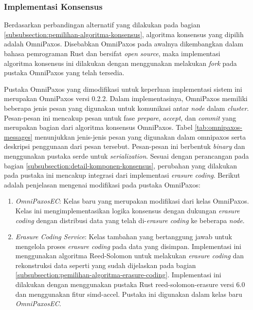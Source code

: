 \subsubsection{Implementasi Konsensus}
\label{subsubsection:implementasi-konsensus}

Berdasarkan perbandingan alternatif yang dilakukan pada bagian \ref{subsubsection:pemilihan-algoritma-konsensus}, algoritma konsensus yang dipilih adalah OmniPaxos. Disebabkan OmniPaxos pada awalnya dikembangkan dalam bahasa pemrograman Rust dan bersifat \textit{open source}, maka implementasi algoritma konsensus ini dilakukan dengan menggunakan melakukan \textit{fork} pada pustaka OmniPaxos yang telah tersedia.

Pustaka OmniPaxos yang dimodifikasi untuk keperluan implementasi sistem ini merupakan OmniPaxos versi 0.2.2. Dalam implementasinya, OmniPaxos memiliki beberapa jenis pesan yang digunakan untuk komunikasi antar \textit{node} dalam \textit{cluster}. Pesan-pesan ini mencakup pesan untuk fase \textit{prepare}, \textit{accept}, dan \textit{commit} yang merupakan bagian dari algoritma konsensus OmniPaxos. Tabel \ref{tab:omnipaxos-messages} menunjukkan jenis-jenis pesan yang digunakan dalam omnipaxos serta deskripsi penggunaan dari pesan tersebut. Pesan-pesan ini berbentuk \textit{binary} dan menggunakan pustaka serde untuk \textit{serialization}.
Sesuai dengan perancangan pada bagian \ref{subsubsection:detail-komponen-konsensus}, perubahan yang dilakukan pada pustaka ini mencakup integrasi dari implementasi \textit{erasure coding}. Berikut adalah penjelasan mengenai modifikasi pada pustaka OmniPaxos:

\begin{enumerate}
  \item \textit{OmniPaxosEC}: Kelas baru yang merupakan modifikasi dari kelas OmniPaxos. Kelas ini mengimplementasikan logika konsensus dengan dukungan \textit{erasure coding} dengan distribusi data yang telah di-\textit{erasure coding} ke beberapa \textit{node}. 
  \item \textit{Erasure Coding Service}: Kelas tambahan yang bertanggung jawab untuk mengelola proses \textit{erasure coding} pada data yang disimpan. Implementasi ini menggunakan algoritma Reed-Solomon untuk melakukan \textit{erasure coding} dan rekonstruksi data seperti yang sudah dijelaskan pada bagian \ref{subsubsection:pemilihan-algoritma-erasure-coding}. Implementasi ini dilakukan dengan menggunakan pustaka Rust reed-solomon-erasure versi 6.0 dan menggunakan fitur simd-accel. Pustaka ini digunakan dalam kelas baru \textit{OmniPaxosEC}.
\end{enumerate}

